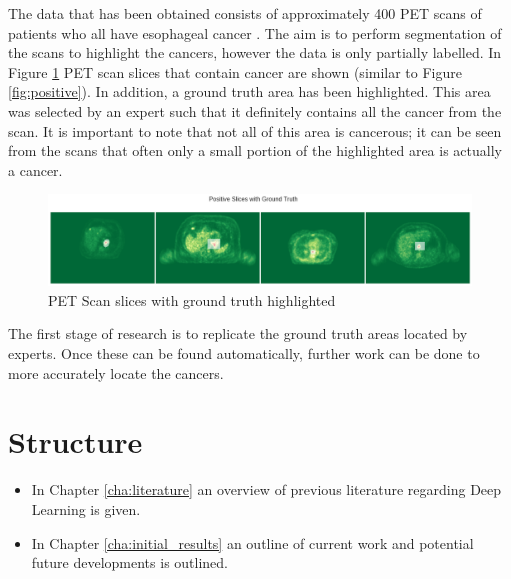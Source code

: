 The data that has been obtained consists of approximately 400 PET scans of patients who all have esophageal cancer \cite{Enzinger_Mayer_2003}.
The aim is to perform segmentation of the scans to highlight the cancers, however the data is only partially labelled.
In Figure \ref{fig:ground_truth} PET scan slices that contain cancer are shown (similar to Figure \ref{fig:positive}).
In addition, a ground truth area has been highlighted.
This area was selected by an expert such that it definitely contains all the cancer from the scan.
It is important to note that not all of this area is cancerous; it can be seen from the scans that often only a small portion of the highlighted area is actually a cancer.

\begin{figure}[hbtp!]
    \centering
    \includegraphics[width=\textwidth]{./img/ground_truth.png}
    \caption{PET Scan slices with ground truth highlighted}
    \label{fig:ground_truth}
\end{figure}

The first stage of research is to replicate the ground truth areas located by experts.
Once these can be found automatically, further work can be done to more accurately locate the cancers.

\section{Structure}\label{sec:structure}

\begin{itemize}
    \item In Chapter \ref{cha:literature} an overview of previous literature regarding Deep Learning is given.
    \item In Chapter \ref{cha:initial_results} an outline of current work and potential future developments is outlined.
\end{itemize}